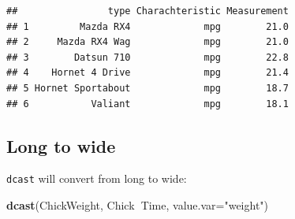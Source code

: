 \documentclass[]{book}
\newenvironment{Shaded}{\begin{snugshade}}{\end{snugshade}}
\newcommand{\KeywordTok}[1]{\textcolor[rgb]{0.13,0.29,0.53}{\textbf{#1}}}
\newcommand{\DataTypeTok}[1]{\textcolor[rgb]{0.13,0.29,0.53}{#1}}
\newcommand{\StringTok}[1]{\textcolor[rgb]{0.31,0.60,0.02}{#1}}
\newcommand{\OperatorTok}[1]{\textcolor[rgb]{0.81,0.36,0.00}{\textbf{#1}}}
\newcommand{\NormalTok}[1]{#1}
\theoremstyle{definition}
\theoremstyle{definition}
\theoremstyle{definition}
\theoremstyle{remark}
\begin{document}
\begin{verbatim}
##                type Charachteristic Measurement
## 1         Mazda RX4             mpg        21.0
## 2     Mazda RX4 Wag             mpg        21.0
## 3        Datsun 710             mpg        22.8
## 4    Hornet 4 Drive             mpg        21.4
## 5 Hornet Sportabout             mpg        18.7
## 6           Valiant             mpg        18.1
\end{verbatim}

\subsection{Long to wide}\label{long-to-wide}

\texttt{dcast} will convert from long to wide:

\begin{Shaded}
\begin{Highlighting}[]
\KeywordTok{dcast}\NormalTok{(ChickWeight, Chick}\OperatorTok{~}\NormalTok{Time, }\DataTypeTok{value.var=}\StringTok{"weight"}\NormalTok{)}
\end{Highlighting}
\end{Shaded}
\end{document}
